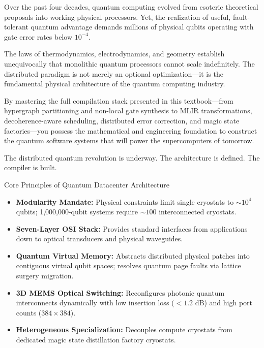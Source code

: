 Over the past four decades, quantum computing evolved from esoteric theoretical proposals into working physical processors. Yet, the realization of useful, fault-tolerant quantum advantage demands millions of physical qubits operating with gate error rates below $10^{-4}$.

The laws of thermodynamics, electrodynamics, and geometry establish unequivocally that monolithic quantum processors cannot scale indefinitely. The distributed paradigm is not merely an optional optimization---it is the fundamental physical architecture of the quantum computing industry.

By mastering the full compilation stack presented in this textbook---from hypergraph partitioning and non-local gate synthesis to MLIR transformations, decoherence-aware scheduling, distributed error correction, and magic state factories---you possess the mathematical and engineering foundation to construct the quantum software systems that will power the supercomputers of tomorrow.

The distributed quantum revolution is underway. The architecture is defined. The compiler is built.


\begin{summarybox}{Core Principles of Quantum Datacenter Architecture}
\begin{itemize}
    \item \textbf{Modularity Mandate:} Physical constraints limit single cryostats to $\sim 10^4$ qubits; 1,000,000-qubit systems require $\sim 100$ interconnected cryostats.
    \item \textbf{Seven-Layer OSI Stack:} Provides standard interfaces from applications down to optical transducers and physical waveguides.
    \item \textbf{Quantum Virtual Memory:} Abstracts distributed physical patches into contiguous virtual qubit spaces; resolves quantum page faults via lattice surgery migration.
    \item \textbf{3D MEMS Optical Switching:} Reconfigures photonic quantum interconnects dynamically with low insertion loss ($< 1.2$ dB) and high port counts ($384 \times 384$).
    \item \textbf{Heterogeneous Specialization:} Decouples compute cryostats from dedicated magic state distillation factory cryostats.
\end{itemize}
\end{summarybox}

